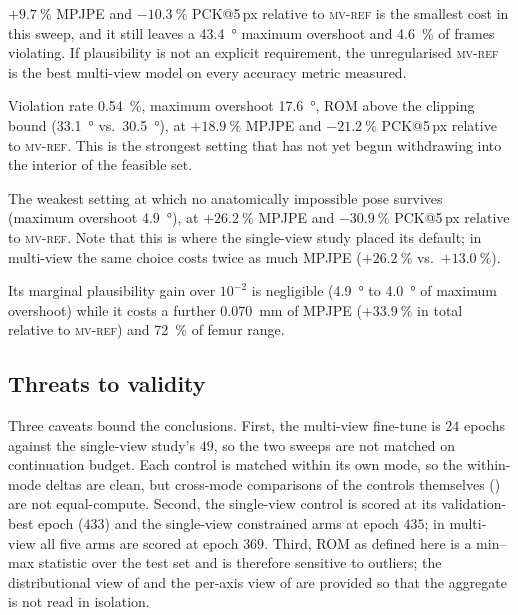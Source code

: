 \documentclass[11pt,a4paper]{article}
\newcommand{\lam}{\lambda}
\newcommand{\armref}{\textsc{mv-ref}}
\begin{document}
\begin{description}[leftmargin=1.4em,style=nextline,itemsep=0.35em]
\item[Accuracy-critical use --- $\lam = 10^{-4}$, or none at all.]
  $+\SI{9.7}{\percent}$ MPJPE and $-\SI{10.3}{\percent}$ PCK@5\,px relative to
  \armref{} is the smallest cost in this sweep, and it still leaves a
  \SI{43.4}{\degree} maximum overshoot and \SI{4.6}{\percent} of frames
  violating. If plausibility is not an explicit requirement, the unregularised
  \armref{} is the best multi-view model on every accuracy metric measured.
\item[Balanced use --- $\lam = 10^{-3}$ (recommended default).]
  Violation rate \SI{0.54}{\percent}, maximum overshoot \SI{17.6}{\degree}, ROM
  above the clipping bound (\SI{33.1}{\degree} vs.\ \SI{30.5}{\degree}), at
  $+\SI{18.9}{\percent}$ MPJPE and $-\SI{21.2}{\percent}$ PCK@5\,px relative to
  \armref{}. This is the strongest setting that has not yet
  begun withdrawing into the interior of the feasible set.
\item[Hard plausibility requirement --- $\lam = 10^{-2}$.]
  The weakest setting at which no anatomically impossible pose survives
  (maximum overshoot \SI{4.9}{\degree}), at $+\SI{26.2}{\percent}$ MPJPE and
  $-\SI{30.9}{\percent}$ PCK@5\,px relative to \armref{}. Note that this is
  where the single-view study placed its default; in multi-view the same
  choice costs twice as much MPJPE ($+\SI{26.2}{\percent}$ vs.\
  $+\SI{13.0}{\percent}$).
\item[Not recommended --- $\lam = 10^{-1}$.]
  Its marginal plausibility gain over $10^{-2}$ is negligible
  (\SI{4.9}{\degree} to \SI{4.0}{\degree} of maximum overshoot) while it costs
  a further \SI{0.070}{\milli\metre} of MPJPE ($+\SI{33.9}{\percent}$ in total
  relative to \armref{}) and \SI{72}{\percent} of femur range.
\end{description}

\subsection{Threats to validity}

Three caveats bound the conclusions. First, the multi-view
fine-tune is $24$ epochs against the single-view study's $49$, so the two
sweeps are not matched on continuation budget. Each control is matched within
its own mode, so the within-mode deltas are clean, but cross-mode comparisons
of the controls themselves (\Cref{sec:compare}) are not equal-compute. Second,
the single-view control is scored at its validation-best epoch ($433$) and the
single-view constrained arms at epoch $435$; in multi-view all five arms are
scored at epoch $369$. Third, ROM as defined here is a min--max
statistic over the test set and is therefore sensitive to outliers; the
distributional view of \Cref{fig:ratio} and the per-axis view of
\Cref{fig:scatter} are provided so that the aggregate is not read in isolation.
\end{document}
